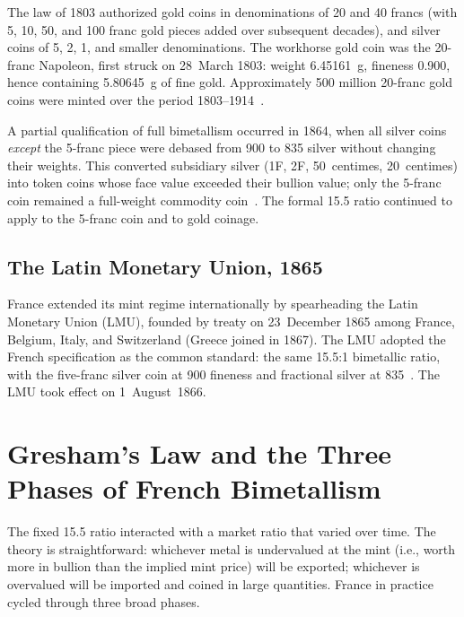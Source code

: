 \documentclass[12pt,letterpaper]{article}
\begin{document}
The law of 1803 authorized gold coins in denominations of 20 and 40 francs (with 5,
10, 50, and 100 franc gold pieces added over subsequent decades), and silver coins of
5, 2, 1, and smaller denominations.  The workhorse gold coin was the 20-franc
Napoleon, first struck on 28~March 1803: weight 6.45161~g, fineness
0.900, hence containing 5.80645~g of fine gold.  Approximately 500 million 20-franc
gold coins were minted over the period 1803--1914~\citep{thomasnumismatics}.

A partial qualification of full bimetallism occurred in 1864, when all silver coins
\emph{except} the 5-franc piece were debased from 900\textperthousand{} to
835\textperthousand{} silver without changing their weights.  This converted
subsidiary silver (1F, 2F, 50~centimes, 20~centimes) into token coins whose face
value exceeded their bullion value; only the 5-franc coin remained a full-weight
commodity coin~\citep{wikipedia_frenchfranc}.  The formal 15.5 ratio continued to
apply to the 5-franc coin and to gold coinage.

\subsection{The Latin Monetary Union, 1865}

France extended its mint regime internationally by spearheading the Latin Monetary
Union (LMU), founded by treaty on 23~December 1865 among France, Belgium, Italy,
and Switzerland (Greece joined in 1867).  The LMU adopted the French specification
as the common standard: the same 15.5:1 bimetallic ratio, with the five-franc silver
coin at 900\textperthousand{} fineness and fractional silver at
835\textperthousand{}~\citep{wikipedia_lmu}.  The LMU took effect on
1~August~1866.

\section{Gresham's Law and the Three Phases of French Bimetallism}

The fixed 15.5 ratio interacted with a market ratio that varied over time.  The
theory is straightforward: whichever metal is undervalued at the mint (i.e., worth
more in bullion than the implied mint price) will be exported; whichever is
overvalued will be imported and coined in large quantities.  France in practice
cycled through three broad phases.
\end{document}
